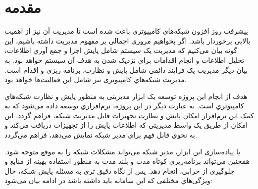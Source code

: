 \chapter{مقدمه}

پیشرفت روز افزون شبکه‌هاي کامپیوتري باعث شده است تا مدیریت آن نیز از اهمیت بالایی برخوردار باشد. اگر بخواهیم مروري اجمالی بر مفهوم مدیریت داشته باشیم، این گونه بیان می‌کنیم که مدیریت یک سیستم شامل پایش اجزا و جمع آوري اطلاعات، تحلیل اطلاعات و انجام اقدامات براي نزدیک شدن به هدف آن سیستم خواهد بود. به بیان دیگر مدیریت یک فرایند دائمی شامل پایش و نظارت، برنامه ریزي و اقدام است. مدیریت شبکه‌هاي کامپیوتری نیز شامل این فعالیت‌ها خواهد بود.

هدف از انجام این پروژه توسعه یک ابزار مدیریتی به منظور پایش و نظارت شبکه‌هاي کامپیوتري است. به عبارت دیگر در این پروژه، نرم‌افزاري توسعه داده می‌شود که به کمک این نرم‌افزار امکان پایش و نظارت تجهیزات قابل مدیریت شبکه، فراهم گردد. این امکان از طریق یک واسط مدیریتی که اطلاعات پایش را از تجهیزات دریافت می‌کند و به نحوي قابل فهم براي مدیر شبکه نمایش می‌دهد، فراهم می‌گردد.

با پیاده‌سازی این ابزار، مدیر شبکه می‌تواند مشکلات شبکه را به موقع متوجه شود. همچنین می‌تواند برنامه‌ریزي کوتاه مدت و بلند مدت به منظور استفاده بهینه از منابع و جلوگیري از خرابی، انجام دهد. پس از نگاه دقیق تري به مسئله پایش شبکه، حال ویژگی‌هاي مختلفی که این سامانه باید داشته باشد در ادامه بیان می‌شود:

